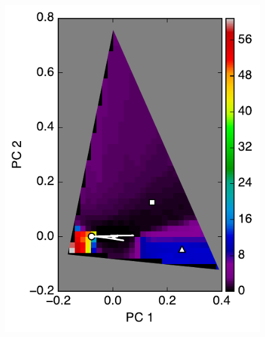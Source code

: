 \documentclass[iop,numberedappendix,apj,]{emulateapj}
\begin{document}
\begin{figure}[tbh!]
   \begin{minipage}{0.33\hsize}
    \begin{center}
\includegraphics[width=\hsize]{mockdata_90deg_3types_t12_lc_noreg.pdf}
    \end{center}
     \end{minipage}   
    \begin{minipage}{0.33\hsize}
    \begin{center}

\end{center}
\end{minipage}
\end{figure}
\end{document}
